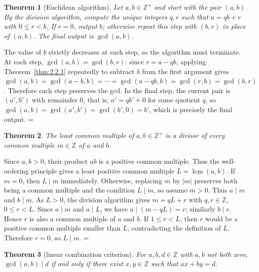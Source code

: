 \documentclass[11pt]{article}
\makeatletter
\let\nt@closedisplay\]
\def\nt@guardedclose{\@ifnextchar\par{\nt@closeafterpar}{\@ifnextchar\end{\postdisplaypenalty\@M\nt@closedisplay}{\nt@closedisplay}}}
\def\nt@closeafterpar\par{\@ifnextchar\par{\nt@closeafterpar}{\@ifnextchar\end{\postdisplaypenalty\@M\nt@closedisplay\par}{\nt@closedisplay\par}}}
\renewenvironment{proof}[1][\proofname]{\par
  \pushQED{\qed}\normalfont\topsep\medskipamount\edef\nt@afterproof{\@endparpenalty=\the\@endparpenalty\relax}\@beginparpenalty\@M\@endparpenalty\@M\let\]\nt@guardedclose\trivlist\item[]\textit{#1\@addpunct{.}} \ignorespaces}{\ifvmode\addpenalty\@M\fi\popQED\nt@afterproof\endtrivlist\@endpefalse}
\theoremstyle{ntstyle}
\newtheorem{theorem}{Theorem}[subsection]
\DeclareMathOperator{\lcm}{lcm}
\makeatother
\begin{document}
\begin{theorem}[Euclidean algorithm]\label{thm:2.2.2}\label{thm:euclidean-algorithm}
  Let $a, b \in \mathbb{Z}^+$ and start with the pair $(a,b)$. By the division
  algorithm, compute the unique integers $q, r$ such that $a = qb + r$
  with $0 \le r < b$. If $r = 0$, output $b$; otherwise repeat this
  step with $(b, r)$ in place of $(a,b)$. The final output is $\gcd(a, b)$.

\end{theorem}

\begin{proof} The value of $b$ strictly decreases at each
  step, so the algorithm must terminate. At each step, $\gcd(a, b) = \gcd(b, r)$: since $r = a - qb$, applying
  Theorem~\ref{thm:2.2.1} repeatedly to subtract $b$ from the first argument gives
  $\gcd(a, b) = \gcd(a-b, b) = \cdots = \gcd(a-qb, b) = \gcd(r, b) = \gcd(b, r)$. Therefore each step preserves the
  gcd. In the final step, the current
  pair is $(a', b')$ with remainder $0$, that is, $a' = q b' + 0$ for some
  quotient $q$, so $\gcd(a, b) = \gcd(a', b') = \gcd(b', 0) = b'$,
  which is precisely the final output.
\end{proof}

\begin{theorem}\label{thm:2.2.3} The least common multiple of
  $a,b\in\mathbb{Z}^+$ is a divisor of every common multiple
  $m\in\mathbb{Z}$ of $a$ and $b$.

\end{theorem}

\begin{proof} Since $a,b>0$, their product $ab$ is a positive common multiple.
  Thus the well-ordering principle gives a least positive common multiple
  $L=\lcm(a,b)$. If $m=0$, then $L\mid m$ immediately.
  Otherwise, replacing $m$ by $|m|$ preserves both being a common multiple
  and the condition $L\mid m$, so assume $m>0$.
  Thus $a\mid m$ and $b\mid m$. As $L>0$, the division
  algorithm gives $m=qL+r$ with $q,r\in\mathbb{Z}$, $0\le r<L$.
  Since $a\mid m$ and $a\mid L$, we have $a\mid (m-qL)=r$; similarly
  $b\mid r$. Hence $r$ is also a common multiple of $a$ and $b$. If
  $1\le r<L$, then $r$ would be a positive common multiple smaller than
  $L$, contradicting the definition of $L$. Therefore $r=0$, so $L\mid m$.
\end{proof}

\begin{theorem}[linear combination criterion]\label{thm:2.2.4}\label{thm:linear-combination-criterion}
  For
  $a, b, d \in \mathbb{Z}$ with $a,b$ not both zero, $\gcd(a, b) \mid d$ if and only
  if there exist $x, y \in \mathbb{Z}$ such that $ax+by=d$.

\end{theorem}
\end{document}
